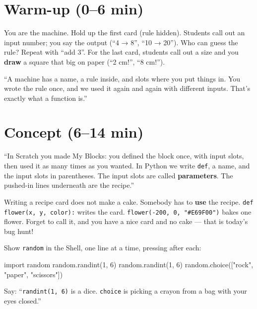 \section{Warm-up (0--6 min)}
\begin{unplugged}
You are the machine. Hold up the first card (rule hidden). Students call out an input number; you say the output (\enquote{4 → 8}, \enquote{10 → 20}). Who can guess the rule? Repeat with \enquote{add 3}. For the last card, students call out a size and you \textbf{draw} a square that big on paper (\enquote{2 cm!}, \enquote{8 cm!}).
\end{unplugged}
\begin{teacherscript}
\enquote{A machine has a name, a rule inside, and slots where you put things in. You wrote the rule once, and we used it again and again with different inputs. That's exactly what a function is.}
\end{teacherscript}

\section{Concept (6--14 min)}
\begin{teacherscript}
\enquote{In Scratch you made My Blocks: you defined the block once, with input slots, then used it as many times as you wanted. In Python we write \texttt{def}, a name, and the input slots in parentheses. The input slots are called \textbf{parameters}. The pushed-in lines underneath are the recipe.}
\end{teacherscript}
\begin{analogy}
Writing a recipe card does not make a cake. Somebody has to \textbf{use} the recipe. \texttt{def flower(x, y, color):} writes the card. \texttt{flower(-200, 0, "\#E69F00")} bakes one flower. Forget to call it, and you have a nice card and no cake --- that is today's bug hunt!
\end{analogy}
Show \texttt{random} in the Shell, one line at a time, pressing  after each:
\begin{pycode}
import random
random.randint(1, 6)
random.randint(1, 6)
random.choice(["rock", "paper", "scissors"])
\end{pycode}
Say: \enquote{\texttt{randint(1, 6)} is a dice. \texttt{choice} is picking a crayon from a bag with your eyes closed.}

